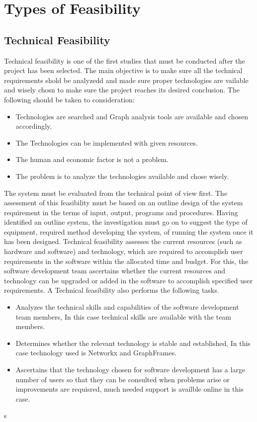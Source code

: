 \section{Types of Feasibility}

\subsection{Technical Feasibility}
Technical feasibility is one of the first studies that must be conducted after the project has been selected. The main objective is to make sure all the technical requirements shold be analyzedd and made sure proper technologies are vailable and wisely chosn to make sure the project reaches its desired conclusion. The following should be taken to consideration:
\begin{itemize}
	\item Technologies are searched and Graph analysis tools are available and chosen accordingly.
	\item The Technologies can be implemented with given resources.
	\item The human and economic factor is not a problem.
	\item The problem is to analyze the technologies available and chose wisely.
\end{itemize}

The system must be evaluated from the technical point of view first. The assessment of this feasibility must be based on an outline design of the system requirement in the terms of input, output, programs and procedures. Having identified an outline system, the investigation must go on to suggest the type of equipment, required method developing the system, of running the system once it has been designed. Technical feasibility assesses the current resources (such as hardware and software) and technology, which are required to accomplish user requirements in the software within the allocated time and budget. For this, the software development team ascertains whether the current resources and technology can be upgraded or added in the software to accomplish specified user requirements. A Technical feasibility also performs the following tasks.

\begin{itemize}
	\item Analyzes the technical skills and capabilities of the software development team members, In this case technical skills are available with the team members.
	\item Determines whether the relevant technology is stable and established, In this case technology used is Networkx and GraphFrames.
	\item Ascertains that the technology chosen for software development has a large number of users so that they can be consulted when problems arise or improvements are requisred, much needed support is availble online in this case.
\end{itemize}s

